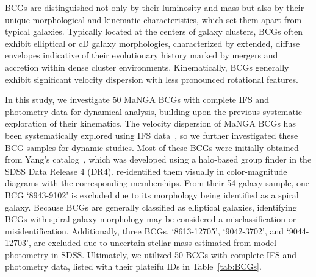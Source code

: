 \documentclass[a4paper, two-column, twocolappendix]{aa}
\begin{document}
BCGs are distinguished not only by their luminosity and mass but also by their unique morphological and kinematic characteristics, which set them apart from typical galaxies. 
Typically located at the centers of galaxy clusters, BCGs often exhibit elliptical or cD galaxy morphologies, characterized by extended, diffuse envelopes indicative of their evolutionary history marked by mergers and accretion within dense cluster environments. 
Kinematically, BCGs generally exhibit significant velocity dispersion with less pronounced rotational features. 


In this study, we investigate 50 MaNGA BCGs with complete IFS and photometry data for dynamical analysis, 
 building upon the previous systematic exploration of their kinematics.
The velocity dispersion of MaNGA BCGs has been systematically explored using IFS data~\citep{Tian21a}, 
 so we further investigated these BCG samples for dynamic studies. 
Most of these BCGs were initially obtained from Yang's catalog~\citep{Yang07}, 
 which was developed using a halo-based group finder in the SDSS Data Release 4 (DR4). 
\cite{Hsu21} re-identified them visually in color-magnitude diagrams with the corresponding memberships. 
From their 54 galaxy sample, one BCG `8943-9102' is excluded due to its morphology being identified as a spiral galaxy.
Because BCGs are generally classified as elliptical galaxies, identifying BCGs with spiral galaxy morphology may be considered a misclassification or misidentification.
Additionally, three BCGs, `8613-12705', `9042-3702', and `9044-12703', are excluded due to uncertain stellar mass estimated from model photometry in SDSS. 
Ultimately, we utilized 50 BCGs with complete IFS and photometry data, listed with their plateifu IDs in Table~\ref{tab:BCGs}. 
\end{document}
